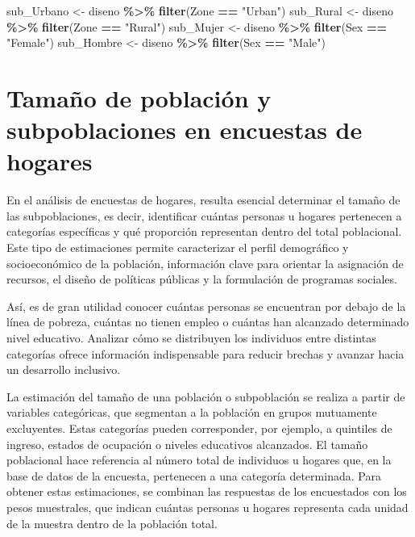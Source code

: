 \documentclass[
  12pt,
]{book}
\newenvironment{Shaded}{\begin{snugshade}}{\end{snugshade}}
\newcommand{\FunctionTok}[1]{\textcolor[rgb]{0.13,0.29,0.53}{\textbf{#1}}}
\newcommand{\NormalTok}[1]{#1}
\newcommand{\OtherTok}[1]{\textcolor[rgb]{0.56,0.35,0.01}{#1}}
\newcommand{\SpecialCharTok}[1]{\textcolor[rgb]{0.81,0.36,0.00}{\textbf{#1}}}
\newcommand{\StringTok}[1]{\textcolor[rgb]{0.31,0.60,0.02}{#1}}
\begin{document}
\begin{Shaded}
\begin{Highlighting}[]
\NormalTok{sub\_Urbano }\OtherTok{\textless{}{-}}\NormalTok{ diseno }\SpecialCharTok{\%\textgreater{}\%}  \FunctionTok{filter}\NormalTok{(Zone }\SpecialCharTok{==} \StringTok{"Urban"}\NormalTok{)}
\NormalTok{sub\_Rural  }\OtherTok{\textless{}{-}}\NormalTok{ diseno }\SpecialCharTok{\%\textgreater{}\%}  \FunctionTok{filter}\NormalTok{(Zone }\SpecialCharTok{==} \StringTok{"Rural"}\NormalTok{)}
\NormalTok{sub\_Mujer  }\OtherTok{\textless{}{-}}\NormalTok{ diseno }\SpecialCharTok{\%\textgreater{}\%}  \FunctionTok{filter}\NormalTok{(Sex }\SpecialCharTok{==} \StringTok{"Female"}\NormalTok{)}
\NormalTok{sub\_Hombre }\OtherTok{\textless{}{-}}\NormalTok{ diseno }\SpecialCharTok{\%\textgreater{}\%}  \FunctionTok{filter}\NormalTok{(Sex }\SpecialCharTok{==} \StringTok{"Male"}\NormalTok{)}
\end{Highlighting}
\end{Shaded}

\section{Tamaño de población y subpoblaciones en encuestas de hogares}\label{tamauxf1o-de-poblaciuxf3n-y-subpoblaciones-en-encuestas-de-hogares}

En el análisis de encuestas de hogares, resulta esencial determinar el tamaño de las subpoblaciones, es decir, identificar cuántas personas u hogares pertenecen a categorías específicas y qué proporción representan dentro del total poblacional. Este tipo de estimaciones permite caracterizar el perfil demográfico y socioeconómico de la población, información clave para orientar la asignación de recursos, el diseño de políticas públicas y la formulación de programas sociales.

Así, es de gran utilidad conocer cuántas personas se encuentran por debajo de la línea de pobreza, cuántas no tienen empleo o cuántas han alcanzado determinado nivel educativo. Analizar cómo se distribuyen los individuos entre distintas categorías ofrece información indispensable para reducir brechas y avanzar hacia un desarrollo inclusivo.

La estimación del tamaño de una población o subpoblación se realiza a partir de variables categóricas, que segmentan a la población en grupos mutuamente excluyentes. Estas categorías pueden corresponder, por ejemplo, a quintiles de ingreso, estados de ocupación o niveles educativos alcanzados. El tamaño poblacional hace referencia al número total de individuos u hogares que, en la base de datos de la encuesta, pertenecen a una categoría determinada. Para obtener estas estimaciones, se combinan las respuestas de los encuestados con los pesos muestrales, que indican cuántas personas u hogares representa cada unidad de la muestra dentro de la población total.
\end{document}
